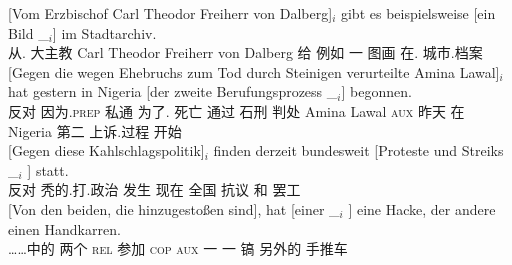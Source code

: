 \begin{sloppypar}
\ex\label{bsp-von-erzbischof-bilder} 
\gll {}[Vom Erzbischof Carl Theodor Freiherr von Dalberg]$_i$ gibt es beispielsweise [ein Bild \_$_i$]
        im Stadtarchiv.\footnotemark\\
	{}\spacebr{}从. 大主教 Carl Theodor Freiherr von Dalberg 给 \expl{} 例如 \spacebr{}一 图画 {} 在. 城市.档案\\
\ex 
\gll {}[Gegen die wegen Ehebruchs zum Tod durch Steinigen verurteilte Amina Lawal]$_i$ hat gestern in Nigeria
    [der zweite Berufungsprozess \_$_i$] begonnen.\footnotemark\\
	{}\spacebr{}反对  因为.\textsc{prep} 私通 为了. 死亡 通过 石刑 判处 Amina Lawal \textsc{aux} 昨天 在 Nigeria \spacebr{} 第二 上诉.过程 {} 开始\\
\ex 
\gll {}[Gegen                  diese        Kahlschlagspolitik]$_i$ finden derzeit bundesweit                     [Proteste und Streiks \_$_i$ ] statt.\footnotemark\\
     {}\spacebr{}反对  秃的.打.政治    发生   现在 \spacebr{}全国 \spacebr{}抗议 和 罢工 {} {} \prt{}\\
\ex 
\gll {}[Von den beiden, die hinzugestoßen sind], hat [einer        \_$_i$ ] eine Hacke, der andere einen Handkarren.\footnotemark\\
	 {}\spacebr{}……中的  两个 \textsc{rel} 参加 \textsc{cop} \textsc{aux} \spacebr{}一 {}    {}  一 镐    另外的  手推车\\

\end{sloppypar}
